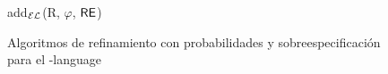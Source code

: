 \begin{figure}[!t]
\begin{algorithm}[H]
\dontprintsemicolon
\caption{add$_\mathcal{EL}$(R, $\varphi$, $\textsf{RE}$)} \label{algo:bisim-add-el-over}
%
\end{algorithm}
\vspace*{-.5cm}\caption{Algoritmos de refinamiento con probabilidades y sobreespecificaci\'on para el \el-language}\label{fig:algo3}

\end{figure}




